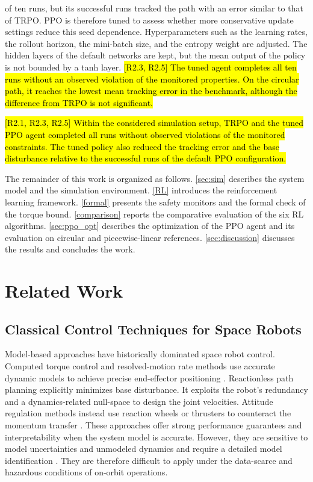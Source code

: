 \documentclass{ieeeaccess}
\newcommand{\hlone}[1]{{\sethlcolor{rone}\hl{#1}}}
\begin{document}
\begin{itemize}
{ of ten runs, but its successful runs tracked the path with an error similar to that of TRPO. PPO is
 therefore tuned} to assess whether more conservative update settings reduce this seed
 dependence. Hyperparameters such as the learning rates,
 the rollout horizon, the mini-batch size, and the entropy weight are adjusted. The hidden layers of the
 default networks are kept, but the mean output of the policy is not bounded by a tanh
 layer. \hlone{[R2.3, R2.5] The tuned agent completes all ten runs without an observed violation of
 the monitored properties. On the circular path, it reaches the lowest mean tracking error in the
 benchmark, although the difference from TRPO is not significant.}
\end{itemize}

\hlone{[R2.1, R2.3, R2.5] Within the considered simulation setup, TRPO and the tuned PPO agent completed
all runs without observed violations of the monitored constraints. The tuned policy also reduced the
tracking error and the base disturbance relative to the successful runs of the default PPO
configuration.}

The remainder of this work is organized as follows.
\cref{sec:sim} describes the system model and the simulation environment. \cref{RL} introduces the
reinforcement learning framework. \cref{formal} presents the safety monitors and the formal
check of the torque bound. \cref{comparison} reports the comparative evaluation of the six RL algorithms.
\cref{sec:ppo_opt} describes the optimization of the PPO agent and its evaluation on circular and
piecewise-linear references. \cref{sec:discussion} discusses the results and concludes the work.

\section{Related Work}

\subsection{Classical Control Techniques for Space Robots}
Model-based approaches have historically dominated space robot control. Computed torque control and
resolved-motion rate methods use accurate dynamic models to achieve precise end-effector positioning
\cite{b1}. Reactionless path planning explicitly minimizes base disturbance. It exploits the robot's
redundancy and a dynamics-related null-space to design the joint velocities. Attitude regulation methods
instead use reaction wheels or thrusters to counteract the momentum transfer \cite{b6,kaigom2011optimal}.
These approaches offer strong performance guarantees and interpretability when the system model is
accurate. However, they are sensitive to model uncertainties and unmodeled dynamics and require a
detailed model identification \cite{b12}. They are therefore difficult to apply under the data-scarce and hazardous
conditions of on-orbit operations.
\end{document}
